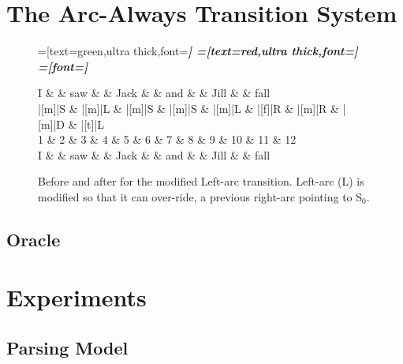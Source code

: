 \documentclass[11pt,letterpaper]{article}
\newcommand{\stacktop}{S$_0$\xspace}
\begin{document}
\section{The Arc-Always Transition System}
\begin{figure}
    \centering
    \begin{dependency}[theme=simple]
        =[text=green,ultra thick,font=\bfseries\itshape]
        =[text=red,ultra thick,font=\bfseries\itshape]
        =[font=\bfseries\itshape]

        \begin{deptext}[column sep=.1cm, row sep=.1ex]
    I \&           \& saw \&          \& Jack       \& \& and     \&           \& Jill   \&      \& fall \\
|[m]|S \& |[m]|L \& |[m]|S   \& |[m]|S \& |[m]|L \& |[f]|R \& |[m]|R \& |[m]|D \& |[t]|L    \\
            1 \&     2       \& 3  \&   4      \& 5          \& 6 \& 7     \& 8 \& 9 \& 10 \& 11 \& 12 \\
    I \&           \& saw \&          \& Jack       \& \& and     \&           \& Jill   \&      \& fall \\
        \end{deptext}

\end{dependency}
\caption{Before and after for the modified Left-arc transition.
    Left-arc (L) is modified so that it can over-ride, a previous
    right-arc pointing to \stacktop.
\label{fig:saw_fall}}
\end{figure}
\subsection{Oracle}

\clearpage


\section{Experiments}

\subsection{Parsing Model}
\end{document}
